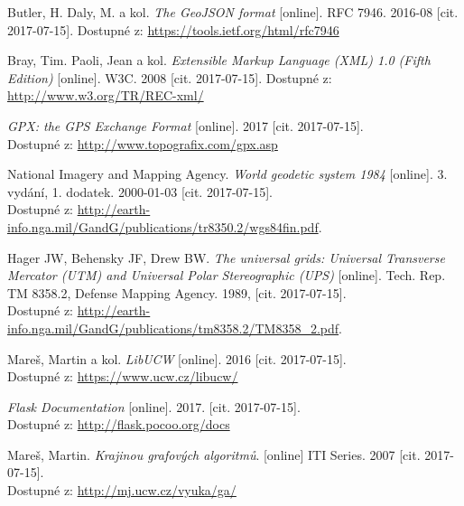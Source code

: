 \begin{raggedright}
\begin{thebibliography}{10}
	{\sc Butler}, H. {\sc Daly}, M. a kol.
	\emph{The GeoJSON format} [online].
	RFC 7946.
	2016-08 [cit. 2017-07-15].
	Dostupné z: \url{https://tools.ietf.org/html/rfc7946}

	{\sc Bray}, Tim. {\sc Paoli}, Jean a kol.
	{\em Extensible Markup Language (XML) 1.0 (Fifth Edition)} [online].
	W3C.
	2008 [cit. 2017-07-15].
	Dostupné z:
	\url{http://www.w3.org/TR/REC-xml/}

	\emph{GPX: the GPS Exchange Format} [online]. 
	2017 [cit. 2017-07-15].\\ 
	Dostupné z: \url{http://www.topografix.com/gpx.asp}

	{\sc National Imagery and Mapping Agency.}
	\emph{World geodetic system 1984} [online]. 
	3. vydání, 1. dodatek.
	2000-01-03 [cit. 2017-07-15]. \\
	Dostupné z: \url{http://earth-info.nga.mil/GandG/publications/tr8350.2/wgs84fin.pdf}.

	{\sc Hager} JW, {\sc Behensky} JF, {\sc Drew} BW.
	\emph{The universal grids: Universal Transverse Mercator (UTM) and Universal 
	Polar Stereographic (UPS)} [online].
	Tech. Rep. TM 8358.2, Defense Mapping Agency.
	1989, [cit. 2017-07-15].\\
	Dostupné z: \url{http://earth-info.nga.mil/GandG/publications/tm8358.2/TM8358_2.pdf}.

	{\sc Mareš}, Martin a kol.
	\emph{LibUCW} [online].
	2016 [cit. 2017-07-15].\\
	Dostupné z: \url{https://www.ucw.cz/libucw/}	

	\emph{Flask Documentation} [online].
	2017. [cit. 2017-07-15].\\
	Dostupné z: \url{http://flask.pocoo.org/docs}

	{\sc Mareš}, Martin.
	\emph{Krajinou grafových algoritmů}. [online]
	ITI Series.
	2007 [cit. 2017-07-15].\\
	Dostupné z: \url{http://mj.ucw.cz/vyuka/ga/}

\end{thebibliography}
\end{raggedright}
